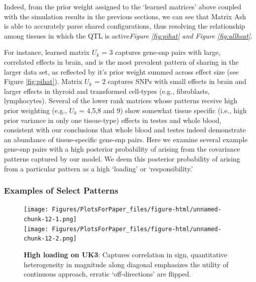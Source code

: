  
Indeed, from the prior weight assigned to the `learned matrices' above coupled with the simulation results in the previous sections, we can see that Matrix Ash is able to accurately parse shared configurations, thus resolving the relationship among tissues in which the QTL is active\textit{Figure \ref{fig:pihat} and Figure \ref{fig:allheat}}. 

For instance, learned matrix $U_{k}$ = 3 captures gene-snp pairs with large, correlated effects in brain, and is the most prevalent pattern of sharing in the larger data set, as reflected by it's prior weight summed across effect size (see Figure \ref{fig:pihat}). Matrix $U_{k}$ = 2 captures SNPs with small effects in brain and larger effects in thyroid and transformed cell-types (e.g., fibroblasts, lymphocytes). Several of the lower rank matrices whose patterns receive high prior weighting (e.g., $U_{k}$ = 4,5,8 and 9) show somewhat tissue specific (i.e., high prior variance in only one tissue-type) effects in testes and whole blood, consistent with our conclusions that whole blood and testes indeed demonstrate an abundance of tissue-specific gene-snp pairs. Here we examine several example gene-snp pairs with a high posterior probability of arising from the covariance patterns captured by our model. We deem this posterior probability of arising from a particular pattern as a high `loading' or `responsibility.' 


\subsubsection{Examples of Select Patterns}

\begin{figure}[htbp]
\texttt{[image: Figures/PlotsForPaper\_files/figure-html/unnamed-chunk-12-1.png]}\\
\texttt{[image: Figures/PlotsForPaper\_files/figure-html/unnamed-chunk-12-2.png]}
\caption{\textbf{High loading on UK3}: Captures correlation in sign, quantitative heterogeneity in magnitude along diagonal emphasizes the utility of continuous approach, erratic `off-directions' are flipped.}
\label{fig:uk3}
\end{figure}


